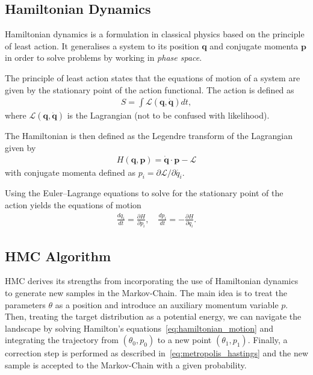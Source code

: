 \documentclass[11pt]{article}
\begin{document}
\subsection{Hamiltonian Dynamics}\label{subsec:hamiltonian_dynamics}
    Hamiltonian dynamics is a formulation in classical physics based on the principle of least action.
    It generalises a system to its position $\mathbf{q}$ and conjugate momenta $\mathbf{p}$ in order to solve problems
    by working in \emph{phase space}.

    The principle of least action states that the equations of motion of a system are given by the stationary point of
    the action functional.
    The action is defined as
    \begin{equation}\label{eq:action_definition}
    \begin{aligned}
        S = \int  \mathcal{L}(\mathbf{q}, \mathbf{\dot{q}}) dt,
    \end{aligned}
    \end{equation}
    where $\mathcal{L}(\mathbf{q}, \mathbf{\dot{q}})$ is the Lagrangian (not to be confused with likelihood).

    The Hamiltonian is then defined as the Legendre transform of the Lagrangian given by
    \begin{equation}\label{eq:hamiltonian_definition}
    \begin{aligned}
        H(\mathbf{q}, \mathbf{p}) = \mathbf{\dot{q}} \cdot \mathbf{p} - \mathcal{L}
    \end{aligned}
    \end{equation}
    with conjugate momenta defined as $p_i = \partial \mathcal{L} / \partial \dot{q_i}$.

    Using the Euler--Lagrange equations to solve for the stationary point of the action yields the equations of motion
    \begin{equation}\label{eq:hamiltonian_motion}
    \begin{aligned}
        \frac{dq_i}{dt} = \frac{\partial H}{\partial p_i}, \quad \frac{dp_i}{dt} = -\frac{\partial H}{\partial q_i}.
    \end{aligned}
    \end{equation}

\subsection{HMC Algorithm}\label{subsec:hmc_algorithm}
    HMC derives its strengths from incorporating the use of Hamiltonian dynamics to generate new samples in the Markov-Chain.
    The main idea is to treat the parameters $\theta$ as a position and introduce an auxiliary momentum variable $p$.
    Then, treating the target distribution as a potential energy, we can navigate the landscape by solving Hamilton's
    equations~\eqref{eq:hamiltonian_motion} and integrating the trajectory from $(\theta_0, p_0)$ to a new point
    $(\theta_1, p_1)$.
    Finally, a correction step is performed as described in~\eqref{eq:metropolis_hastings} and the new sample is accepted
    to the Markov-Chain with a given probability.
\end{document}
